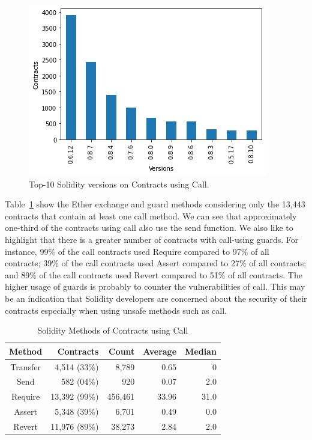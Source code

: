 \documentclass[10pt,conference]{IEEEtran}
\begin{document}
\begin{figure}[h]
  \centering
  \includegraphics[width=\linewidth]{./img/call_clean_final.png}
  \caption{Top-10 Solidity versions on Contracts using Call. }
  \label{fig:call_version}
\end{figure}

Table~\ref{tab:call} show the Ether exchange and guard methods considering only the 13,443 contracts that contain at least one call method. We can see that approximately one-third of the contracts using call also use the send function. We also like to highlight that there is a greater number of contracts with call-using guards. For instance, 99\% of the call contracts used Require compared to 97\% of all contracts; 39\% of the call contracts used Assert compared to 27\% of all contracts; and 89\% of the call contracts used Revert compared to 51\% of all contracts. The higher usage of guards is probably to counter the vulnerabilities of call. This may be an indication that Solidity developers are concerned about the security of their contracts especially when using unsafe methods such as call.

\begin{table}
\center
  \caption{Solidity Methods of Contracts using Call}
  \label{tab:call}
  \begin{tabular}{crrrr}
    \hline
    Method & Contracts & Count & Average & Median\\
    \hline
    Transfer & 4,514 (33\%) & 8,789 & 0.65 & 0\\
    Send &582 (04\%) & 920 & 0.07 & 2.0\\
    Require &13,392 (99\%) & 456,461 & 33.96 & 31.0 \\
    Assert & 5,348 (39\%) & 6,701 & 0.49 & 0.0\\
    Revert & 11,976 (89\%) & 38,273 & 2.84 & 2.0\\
\end{tabular}
\end{table}
\end{document}
